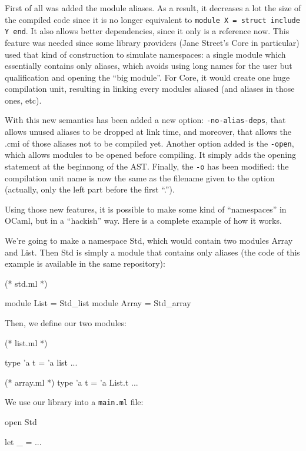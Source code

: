 \documentclass[11pt,a4paper]{article}
\begin{document}
First of all was added the module aliases. As a result, it decreases a lot the
size of the compiled code since it is no longer equivalent to \lstinline{module X = struct include Y end}. It also allows better dependencies, since it only
is a reference now. This feature was needed since some library providers (Jane
Street's Core in particular) used that kind of construction to simulate
namespaces: a single module which essentially contains only aliases, which
avoids using long names for the user but qualification and opening the ``big
module''. For Core, it would create one huge compilation unit, resulting in
linking every modules aliased (and aliases in those ones, etc).

With this new semantics has been added a new option: \texttt{-no-alias-deps},
that allows unused aliases to be dropped at link time, and moreover, that allows
the .cmi of those aliases not to be compiled yet. Another option added is the
\texttt{-open}, which allows modules to be opened before compiling. It simply adds
the opening statement at the beginnong of the AST. Finally, the \texttt{-o} has
been modified: the compilation unit name is now the same as the filename given
to the option (actually, only the left part before the first ``.'').

Using those new features, it is possible to make some kind of ``namespaces'' in
OCaml, but in a ``hackish'' way. Here is a complete example of how it works.

We're going to make a namespace Std, which would contain two modules Array and
List. Then Std is simply a module that contains only aliases (the code of this
example is available in the same repository):

\begin{OCaml}
(* std.ml *)

module List = Std_list
module Array = Std_array
\end{OCaml}

Then, we define our two modules:

\begin{OCaml}
(* list.ml *)

type 'a t = 'a list
...

(* array.ml *)
type 'a t = 'a List.t 
...
\end{OCaml}

We use our library into a \texttt{main.ml} file:

\begin{OCaml}
open Std

let _ = ...
\end{OCaml}
\end{document}
